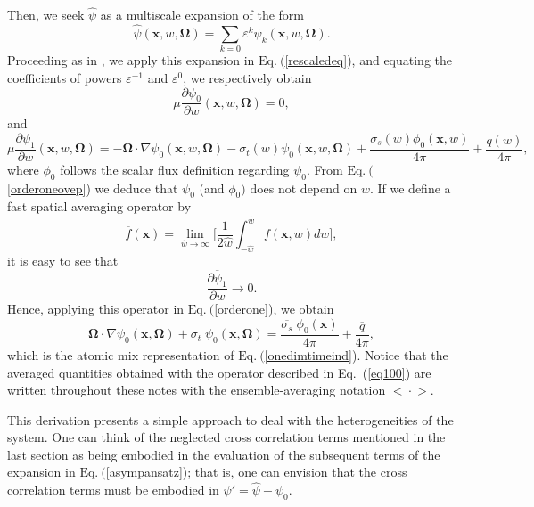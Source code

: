 \documentclass[12pt]{article}
\newcommand{\ep}{\varepsilon}
\newcommand{\bl}{\big<}
\newcommand{\bg}{\big>}
\newcommand{\n}{ \noindent}
\begin{document}
Then, we seek $\hat\psi$ as a multiscale expansion of the form
\begin{equation}\label{asympansatz}
\hat\psi(\bm x,w,\bm\Omega) = \sum_{k=0}\ep^k\psi_k(\bm x,w,\bm\Omega).
\end{equation}
Proceeding as in \cite{dumas_00}, we apply this expansion in $\textrm{Eq.}\ ($\ref{rescaledeq}), and equating the coefficients  of powers $\ep^{-1}$ and $\ep^0$, we respectively obtain 
\begin{equation}\label{orderoneovep}
\mu\frac{\partial \psi_0}{\partial w}(\bm x,w,\bm\Omega) = 0,
\end{equation}
and 
\begin{equation}\label{orderone}
\mu \frac{\partial \psi_1}{\partial w}(\bm x,w,\bm\Omega) =
 -\bm\Omega\cdot\nabla\psi_0(\bm x,w,\bm\Omega)-\sigma_t(w)\psi_0(\bm x,w,\bm\Omega)
 +\frac{\sigma_s(w)\phi_0(\bm x,w)}{4\pi}+\frac{q(w)}{4\pi},
\end{equation}
\n where $\phi_0$ follows the scalar flux definition regarding $\psi_0$.
From $\textrm{Eq.}\ ($\ref{orderoneovep}) we deduce that $\psi_0$ (and $\phi_0)$ does not depend on $w$.
If we define a fast spatial averaging operator \cite{larsen_03,larsen_rio} by 
\begin{equation}\label{eq100}
\overline{f}(\bm x) = \lim_{\hat w\rightarrow\infty}\bigg[\frac{1}{2\hat w}\int_{-\hat w}^{\hat w}
f(\bm x,w)dw\bigg],
\end{equation}
it is easy to see that
\begin{equation}
\overline{\frac{\partial \psi_1}{\partial w}} \rightarrow 0.
\end{equation}
Hence, applying this operator in $\textrm{Eq.}\ ($\ref{orderone}), we obtain
\begin{equation}\label{atmixscaled}
\bm\Omega\cdot\nabla\psi_0(\bm x,\bm\Omega) + \overline{\sigma_t}\;\psi_0(\bm x,\bm\Omega) =
\frac{\overline{\sigma_s}\;\phi_0(\bm x)}{4\pi}+\frac{\overline{q}}{4\pi},
\end{equation}
which is the atomic mix representation of $\textrm{Eq.}\ ($\ref{onedimtimeind}).
 Notice that the averaged quantities obtained with the operator described in Eq.\ (\ref{eq100}) are written throughout these notes with the ensemble-averaging notation $\bl \cdot \bg$.

This derivation presents a simple approach to deal with the heterogeneities of the system.
One can think of the neglected cross correlation terms mentioned in the last section as being embodied in the evaluation of the subsequent terms of the expansion in $\textrm{Eq.}\ ($\ref{asympansatz}); that is, one can envision that the cross correlation terms must be embodied in $\psi'=\hat\psi-\psi_0$.
\end{document}
